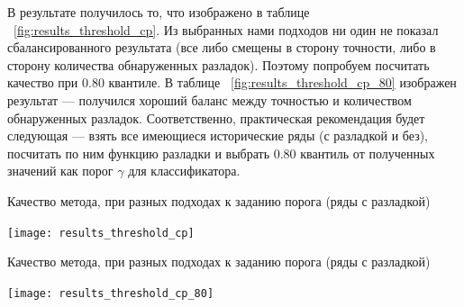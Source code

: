 \documentclass[%
12pt,
master,  %
natbib,      %
subf,        %
substylefile = spbu.rtx,
href,        %
colorlinks,  %
]{disser}
\begin{document}
В результате получилось то, что изображено в таблице ~\ref{fig:results_threshold_cp}. Из выбранных нами подходов ни один не показал сбалансированного результата (все либо смещены в сторону точности, либо в сторону количества обнаруженных разладок). Поэтому попробуем посчитать качество при 0.80 квантиле. В таблице ~\ref{fig:results_threshold_cp_80} изображен результат --- получился хороший баланс между точностью и количеством обнаруженных разладок. Соответственно, практическая рекомендация будет следующая --- взять все имеющиеся исторические ряды (с разладкой и без), посчитать по ним функцию разладки и выбрать 0.80 квантиль от полученных значений как порог $\gamma$ для классификатора.

\begin{table}[!hhh]
	\caption{Качество метода, при разных подходах к заданию порога (ряды с разладкой)}
	\begin{center}
		\vspace{-5mm}\texttt{[image: results\_threshold\_cp]}
	\end{center}
	
	\label{fig:results_threshold_cp}
\end{table}

\begin{table}[!hhh]
	\caption{Качество метода, при разных подходах к заданию порога (ряды с разладкой)}
	\begin{center}
		\vspace{-5mm}\texttt{[image: results\_threshold\_cp\_80]}
	\end{center}
	
	\label{fig:results_threshold_cp_80}
\end{table}
\end{document}
